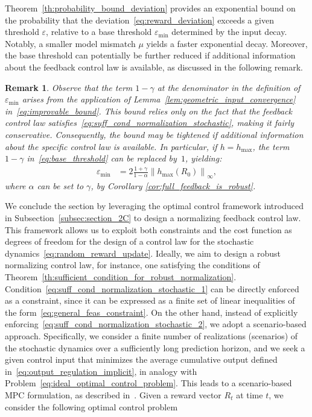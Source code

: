 \documentclass[10pt,leqno]{amsart}
\newcommand{\sml}{\scriptscriptstyle}
\newcommand{\norm}[1]{\left \|#1 \right \|}
\newcommand{\Cost}{R}
\newcommand{\disc}{\gamma}
\newcommand{\infnorm}[1]{\norm{#1}_\infty}
\newcommand{\outmap}{h_{\sml \text{max}}}
\newcommand{\threshold}{\varepsilon_{\sml \text{min}}}
\newtheorem{remark}[theorem]{Remark}
\begin{document}
\noindent Theorem~\ref{th:probability_bound_deviation} provides an exponential bound on the probability that the deviation~\eqref{eq:reward_deviation} exceeds a given threshold $\varepsilon$, relative to a base threshold $\threshold$ determined by the input decay. Notably, a smaller model mismatch $\mu$ yields a faster exponential decay. Moreover, the base threshold can potentially be further reduced if additional information about the feedback control law is available, as discussed in the following remark.
\begin{remark}
    Observe that the term $1 - \disc$ at the denominator in the definition of $\threshold$ arises from the application of Lemma~\ref{lem:geometric_input_convergence} in~\eqref{eq:improvable_bound}. This bound relies only on the fact that the feedback control law satisfies~\eqref{eq:suff_cond_normalization_stochastic}, making it fairly conservative. Consequently, the bound may be tightened if additional information about the specific control law is available. In particular, if $h = \outmap$, the term $1 - \disc$ in~\eqref{eq:base_threshold} can be replaced by~$1$, yielding:
    \begin{align*}
        \threshold &= 2\frac{1 + \disc}{1 - \alpha} \infnorm{\outmap(\Cost_0)},
    \end{align*}
    where $\alpha$ can be set to $\disc$, by Corollary \ref{cor:full_feedback_is_robust}.
\end{remark}
\noindent We conclude the section by leveraging the optimal control framework introduced in Subsection~\ref{subsec:section_2C} to design a normalizing feedback control law. This framework allows us to exploit both constraints and the cost function as degrees of freedom for the design of a control law for the stochastic dynamics~\eqref{eq:random_reward_update}. Ideally, we aim to design a robust normalizing control law, for instance, one satisfying the conditions of Theorem~\ref{th:sufficient_condition_for_robust_normalization}. Condition~\eqref{eq:suff_cond_normalization_stochastic_1} can be directly enforced as a constraint, since it can be expressed as a finite set of linear inequalities of the form~\eqref{eq:general_feas_constraint}. On the other hand, instead of explicitly enforcing~\eqref{eq:suff_cond_normalization_stochastic_2}, we adopt a scenario-based approach. Specifically, we consider a finite number of realizations (scenarios) of the stochastic dynamics over a sufficiently long prediction horizon, and we seek a given control input that minimizes the average cumulative output defined in~\eqref{eq:output_regulation_implicit}, in analogy with Problem~\ref{eq:ideal_optimal_control_problem}. This leads to a scenario-based MPC formulation, as described in~\cite[Section 3.2]{schildbach2014scenario}. Given a reward vector $\Cost_t$ at time $t$, we consider the following optimal control problem
\end{document}
